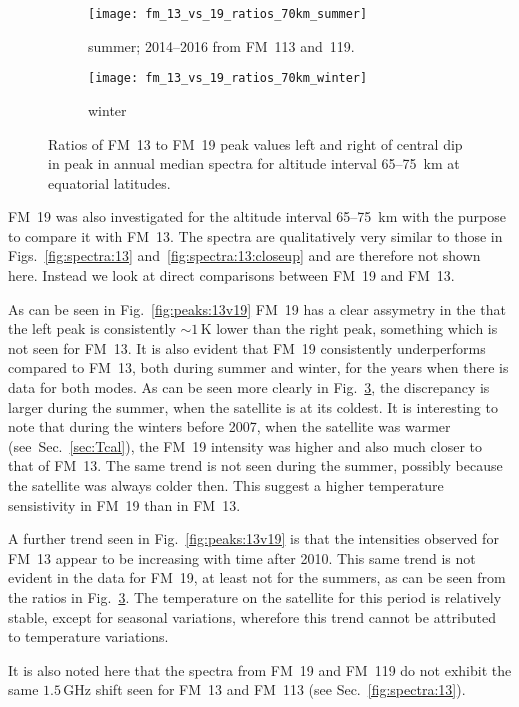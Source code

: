 \begin{figure}[ht]
    \centering
    \begin{subfigure}[b]{0.9545\textwidth}
        \texttt{[image: fm\_13\_vs\_19\_ratios\_70km\_summer]}
        \caption{summer; 2014--2016 from FM~113 and~119.
            }\label{fig:ratios:13v19:summer}
    \end{subfigure}
    \begin{subfigure}[b]{0.9545\textwidth}
        \texttt{[image: fm\_13\_vs\_19\_ratios\_70km\_winter]}
        \caption{winter}\label{fig:ratios:13v19:winter}
    \end{subfigure}
    \caption{Ratios of FM~13 to FM~19 peak values left and right of central dip
        in  peak in annual median spectra for altitude interval
        65--75~km at equatorial latitudes.
    }\label{fig:ratios:13v19}
\end{figure}

\noindent
FM~19 was also investigated for the altitude interval 65--75~km with the
purpose to compare it with FM~13.  The spectra are qualitatively very similar to
those in Figs.~\ref{fig:spectra:13} and~\ref{fig:spectra:13:closeup} and are
therefore not shown here.  Instead we look at direct comparisons between FM~19
and FM~13.

As can be seen in Fig.~\ref{fig:peaks:13v19} FM~19 has a clear assymetry in the
that the left peak is consistently $\sim1\,\mathrm{K}$ lower than the right
peak, something which is not seen for FM~13.  It is also evident that FM~19
consistently underperforms compared to FM~13, both during summer and winter,
for the years when there is data for both modes.  As can be seen more clearly
in Fig.~\ref{fig:ratios:13v19}, the discrepancy is larger during the summer,
when the satellite is at its coldest.  It is interesting to note that during
the winters before 2007, when the satellite was warmer
(see~Sec.~\ref{sec:Tcal}), the FM~19 intensity was higher and also much closer
to that of FM~13.  The same trend is not seen during the summer, possibly
because the satellite was always colder then.  This suggest a higher
temperature sensistivity in FM~19 than in FM~13.

A further trend seen in Fig.~\ref{fig:peaks:13v19} is that the intensities
observed for FM~13 appear to be increasing with time after 2010.  This same
trend is not evident in the data for FM~19, at least not for the summers, as
can be seen from the ratios in Fig.~\ref{fig:ratios:13v19}.  The temperature on
the satellite for this period is relatively stable, except for seasonal
variations, wherefore this trend cannot be attributed to temperature
variations.

It is also noted here that the spectra from FM~19 and FM~119 do not exhibit the
same $1.5\,\mathrm{GHz}$ shift seen for FM~13 and FM~113 (see
Sec.~\ref{fig:spectra:13}).
